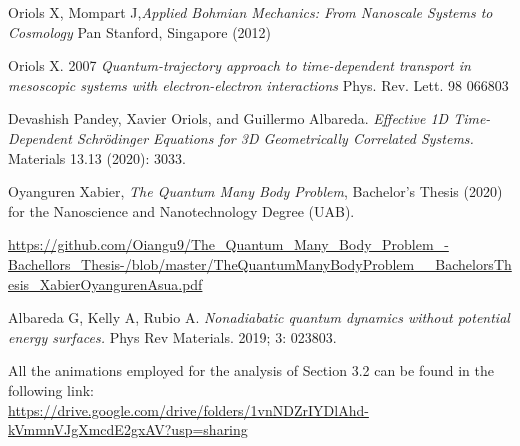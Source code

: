 \documentclass[11pt, a4paper]{article} %
\begin{document}
\begin{thebibliography}{1}

	Oriols X, Mompart J,{\em Applied Bohmian Mechanics: From Nanoscale Systems to Cosmology} Pan Stanford, Singapore (2012)
	
	Oriols X. 2007 {\em Quantum-trajectory approach to time-dependent transport in mesoscopic systems with electron-electron interactions} Phys. Rev. Lett. 98 066803

	Devashish Pandey, Xavier Oriols, and Guillermo Albareda. {\em Effective 1D Time-Dependent Schrödinger Equations for 3D Geometrically Correlated Systems.} Materials 13.13 (2020): 3033.

	Oyanguren Xabier, {\em The Quantum Many Body Problem}, Bachelor's Thesis (2020) for the Nanoscience and Nanotechnology Degree (UAB).

\href{https://github.com/Oiangu9/The\_Quantum\_Many\_Body\_Problem\_-Bachellors\_Thesis-/blob/master/TheQuantumManyBodyProblem\_\_BachelorsThesis\_XabierOyangurenAsua.pdf}{https://github.com/Oiangu9/The\_Quantum\_Many\_Body\_Problem\_-Bachellors\_Thesis-/blob/master/TheQuantumManyBodyProblem\_\_BachelorsThesis\_XabierOyangurenAsua.pdf}

	Albareda G, Kelly A, Rubio A. {\em Nonadiabatic quantum dynamics without potential energy surfaces.} Phys Rev Materials. 2019; 3: 023803. 

	All the animations employed for the analysis of Section 3.2 can be found in the following link:\\
	\href{https://drive.google.com/drive/folders/1vnNDZrIYDlAhd-kVmmnVJgXmcdE2gxAV?usp=sharing}{https://drive.google.com/drive/folders/1vnNDZrIYDlAhd-kVmmnVJgXmcdE2gxAV?usp=sharing}
	
\end{thebibliography}
\end{document}
